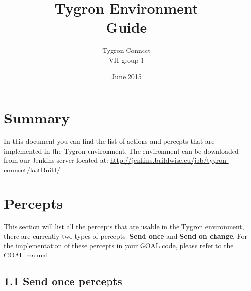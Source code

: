\documentclass[english,11pt]{report}
\title{Tygron Environment \\ Guide}
\author{Tygron Connect \\ VH group 1}
\date{June 2015}
\begin{document}
\maketitle
\tableofcontents

\chapter*{Summary}

In this document you can find the list of actions and percepts that are implemented in the Tygron environment. The environment can be downloaded from our Jenkins server located at: \url{http://jenkins.buildwise.eu/job/tygron-connect/lastBuild/}


\chapter{Percepts}

This section will list all the percepts that are usable in the Tygron environment, there are currently two types of percepts: \textbf{Send once} and \textbf{Send on change}. For the implementation of these percepts in your GOAL code, please refer to the GOAL manual.

\newpage
\section*{1.1 Send once percepts}
\end{document}
